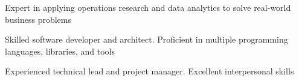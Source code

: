 

\vspace{-4mm}

\cventry
{} %
{} %
{} %
{} %
{
\begin{cvitems} %
\item  {Expert in applying operations research and data analytics to solve real-world business problems} %
\item  {Skilled software developer and architect. Proficient in multiple programming languages, libraries, and tools} 
\item  {Experienced technical lead and project manager. Excellent interpersonal skills} 
\end{cvitems}    
}

